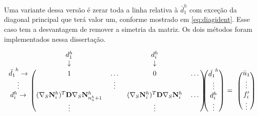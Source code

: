 Uma variante dessa versão é zerar toda a linha relativa à $\bar{d}^h_1$ com exceção da diagonal principal que terá valor um, conforme mostrado em \eqref{eq:diagident}. Esse caso tem a desvantagem de remover a simetria da matriz. Os dois métodos foram implementados nessa dissertação.

\begin{equation} \label{eq:diagident}
\begin{blockarray}{ccccc}
& d_1^h &  & d_i ^h & & \\
& \downarrow &  & \downarrow & & \\
\begin{block}{c(cccc)}
\bar{d_1}^h \rightarrow & 1 & \hdots & 0 & \hdots \\
\vdots                  &   & \vdots &             \\
d_i^h       \rightarrow & \kij{i}{n_u^h + 1}   &      & \kij{i}{i}   & \hdots \\
& \vdots &      & \vdots   &  \\
\end{block}
\end{blockarray} \begin{blockarray}{c}
 \\
 \\
\begin{block}{(c)}
\bar{d_1}^h \\
\vdots\\
d_i^h \\
\vdots  \\
\end{block}
\end{blockarray} \begin{blockarray}{c}
 \\
 \\
 \\
= \\
 \\
\end{blockarray} \begin{blockarray}{c}
 \\
 \\
\begin{block}{(c)}
 \bar{u}_1 \\
\vdots\\
f^\prime_i \\
\vdots  \\
\end{block}
\end{blockarray}
\end{equation}


